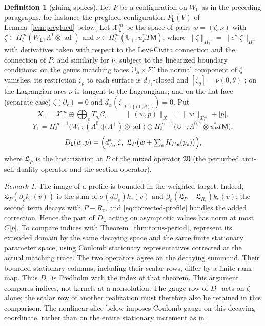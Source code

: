 \documentclass[11pt]{amsart}
\theoremstyle{definition}
\newtheorem{definition}[theorem]{Definition}
\theoremstyle{remark}
\newtheorem{remark}[theorem]{Remark}
\theoremstyle{plain}
\numberwithin{equation}{section}
\newcommand{\ad}{\operatorname{ad}}
\newcommand{\Msf}{\mathsf{M}}
\begin{document}
\begin{definition}[gluing spaces]\label{def:torus-norms}
Let $P$ be a configuration on $W_\mathsf L$ as in the preceding paragraphs, for instance
the preglued configuration $P_{\mathsf L}(V)$ of Lemma~\ref{lem:preglued} below. Let $\mathcal X^m_\mathsf L$ be the space of pairs $w=(\zeta,\nu)$ with
$\zeta\in H^m_\delta(W_\mathsf L;\Lambda^1\otimes\ad)$ and $\nu\in H^m_\delta(\mathbb U_+;u_P^*T\Msf)$, where
$\|\zeta\|_{H^m_\delta}=\|e^{\delta\tau}\zeta\|_{H^m}$ with derivatives taken with respect to the
Levi-Civita connection and the connection of $P$, and similarly for $\nu$, subject
to the linearized boundary conditions: on the genus matching faces
$\mathbb U_\partial\times\Sigma'$ the normal component of $\zeta$ vanishes, its restriction $\zeta_\theta$
to each surface is $d_{A_\theta}$-closed and $[\zeta_\theta]=\nu(0,\theta)$
\cite[Definition~3.9(iii)]{DFL}; on the Lagrangian arcs $\nu$ is tangent to the
Lagrangians; and on the flat face (separate case) $\zeta(\partial_r)=0$ and
$d_\alpha(\zeta|_{T\times\{(\mathsf L,\theta)\}})=0$. Put
\[
X_\mathsf L=\mathcal X^m_\mathsf L\oplus\bigoplus_eT_{q_e}\mathcal C_e,\qquad\|(w,p)\|_{X_\mathsf L}=\|w\|_{\mathcal X^m_\mathsf L}+|p|,
\]
\[
Y_\mathsf L=H^{m-1}_\delta\bigl(W_\mathsf L;(\Lambda^0\oplus\Lambda^+)\otimes\ad\bigr)\oplus
H^{m-1}_\delta\bigl(\mathbb U_+;\Lambda^{0,1}\otimes u_P^*T\Msf\bigr),
\]
\[
D_{\mathsf L}(w,p)=\Bigl(d_{A_P}^*\zeta,\ \mathfrak L_P\bigl(w+\textstyle\sum_e K_{P,e}(p_e)\bigr)\Bigr),
\]
where $\mathfrak L_P$ is the linearization at $P$ of the mixed operator
$\mathfrak M$ (the perturbed anti-self-duality operator and the section operator).
\end{definition}

\begin{remark}\label{rem:torus-index-comparison}
The image of a profile is bounded in the weighted target. Indeed,
$\mathfrak L_P(\beta_e k_e(v))$ is the sum of
$\sigma(d\beta_e)k_e(v)$ and
$\beta_e(\mathfrak L_P-\mathfrak L_{R_e})k_e(v)$;
the second term decays with $P-R_e$, and
\eqref{eq:corrected-profile} handles the added correction. Hence the
part of $D_\mathsf L$ acting on asymptotic values has norm at most
$C|p|$. To compare indices with Theorem~\ref{thm:torus-period},
represent its extended domain by the same decaying space and the
same finite stationary parameter space, using Coulomb stationary
representatives corrected at the actual matching trace. The two
operators agree on the decaying summand. Their bounded stationary
columns, including their scalar rows, differ by a finite-rank map.
Thus $D_\mathsf L$ is Fredholm with the index of that theorem.
This argument compares indices, not kernels at a nonsolution.
The gauge row of $D_\mathsf L$ acts on $\zeta$ alone; the scalar
row of another realization must therefore also be retained in this
comparison. The nonlinear slice below imposes Coulomb gauge on
this decaying coordinate, rather than on the entire stationary
increment as in \cite[Proposition~4.6]{DFL}.
\end{remark}
\end{document}
